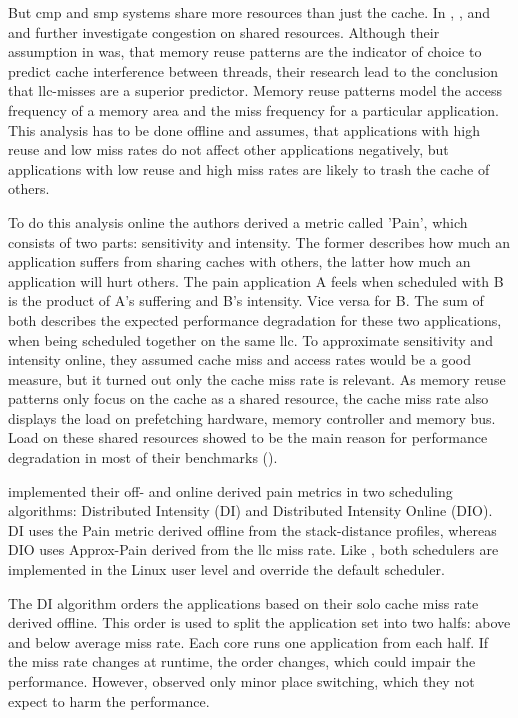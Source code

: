 But \gls{cmp} and \gls{smp} systems share more resources than just the cache.
In \cite{fedorova_managing_2010}, \cite{zhuravlev_addressing_2010}, and
\cite{zhuravlev_survey_2012} \citeauthor{fedorova_managing_2010} and
\citeauthor{zhuravlev_addressing_2010} further investigate congestion on shared
resources.
Although their assumption in \cite{fedorova_managing_2010} was, that memory
reuse patterns are the indicator of
choice to predict cache interference between threads, their research lead to
the conclusion that \gls{llc}-misses are a superior predictor.
Memory reuse patterns model the access frequency of a memory area and the miss
frequency for a particular application.
This analysis has to be done offline and assumes, that applications with high
reuse and low miss rates do not affect other applications negatively, but
applications with low reuse and high miss rates are likely to trash the cache
of others.

To do this analysis online the authors derived a metric called 'Pain', which
consists of two parts: sensitivity and intensity.
The former describes how much an application suffers from sharing caches with
others, the latter how much an application will hurt others.
The pain application A feels when scheduled with B is the product of A's
suffering and B's intensity.
Vice versa for B.
The sum of both describes the expected performance degradation for these two
applications, when being scheduled together on the same \gls{llc}.
To approximate sensitivity and intensity online, they assumed cache miss and
access rates would be a good measure, but it turned out only the cache miss
rate is relevant.
As memory reuse patterns only focus on the cache as a shared resource, the
cache miss rate also displays the load on prefetching hardware, memory
controller and memory bus.
Load on these shared resources showed to be the main reason for performance
degradation in most of their benchmarks (\cite{zhuravlev_addressing_2010}).

\citeauthor{zhuravlev_addressing_2010} implemented their off- and online
derived pain metrics in two scheduling algorithms: Distributed Intensity (DI)
and Distributed Intensity Online (DIO). 
DI uses the Pain metric derived offline from the stack-distance profiles,
whereas DIO uses Approx-Pain derived from the \gls{llc} miss rate.
Like , both schedulers are implemented in the
Linux user level and override the default scheduler.

The DI algorithm orders the applications based on their solo cache miss rate derived
offline.
This order is used to split the application set into two halfs: above and below
average miss rate.
Each core runs one application from each half.
If the miss rate changes at runtime, the order changes, which could impair
the performance.
However, \citeauthor{zhuravlev_addressing_2010} observed only minor place
switching, which they not expect to harm the performance.

